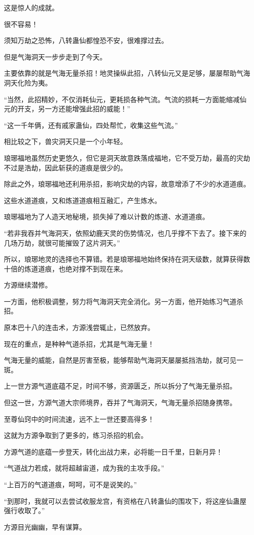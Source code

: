\begin{this_body}
这是惊人的成就。

很不容易！

须知万劫之恐怖，八转蛊仙都惶恐不安，很难撑过去。

但是气海洞天一步步走到了今天。

主要依靠的就是气海无量杀招！地灵操纵此招，八转仙元又是足够，屡屡帮助气海洞天化险为夷。

“当然，此招精妙，不仅消耗仙元，更耗损各种气流。气流的损耗一方面能缩减仙元的开支，另一方还能增强此招的威能！”

“这一千年俩，还有戚家蛊仙，四处帮忙，收集这些气流。”

相比较之下，兽灾洞天只是一个小年轻。

琅琊福地虽然历史更悠久，但它是洞天故意跌落成福地，它不受万劫，最高的灾劫不过是浩劫，因此斩获的道痕是很少的。

除此之外，琅琊福地还利用杀招，影响灾劫的内容，故意增添了不少的水道道痕。

这些水道道痕，又和炼道道痕相互融汇，产生炼水。

琅琊福地为了人造天地秘境，损失掉了难以计数的炼道、水道道痕。

“若非我吞并气海洞天，依照幼鹿天灵的伤势情况，也几乎撑不下去了。接下来的几场万劫，就很可能摧毁了这片洞天。”

所以，琅琊地灵的选择也不算错。若是琅琊福地始终保持在洞天级数，就算获得数十倍的炼道道痕，也绝对撑不到现在来。

方源继续潜修。

一方面，他积极调整，努力将气海洞天完全消化。另一方面，他开始练习气道杀招。

原本巴十八的连击术，方源浅尝辄止，已然放弃。

现在的重点，是种种气道杀招，尤其是气海无量！

气海无量的威能，自然是厉害至极，能够帮助气海洞天屡屡抵挡浩劫，就可见一斑。

上一世方源气道底蕴不足，时间不够，资源匮乏，所以拆分了气海无量杀招。

但这一世，方源气道大宗师境界，吞并了气海洞天，气海无量杀招随身携带。

至尊仙窍中的时间流速，远不上一世还要高得多！

这就为方源争取到了更多的，练习杀招的机会。

方源气道的底蕴一步登天，转化出战力来，必将能一日千里，日新月异！

“气道战力若成，就将超越宙道，成为我的主攻手段。”

“上百万的气道道痕，呵呵，可不是说笑的。”

“到那时，我就可以去尝试收服龙宫，有资格在八转蛊仙的围攻下，将这座仙蛊屋强行收取了。”

方源目光幽幽，早有谋算。

\end{this_body}

